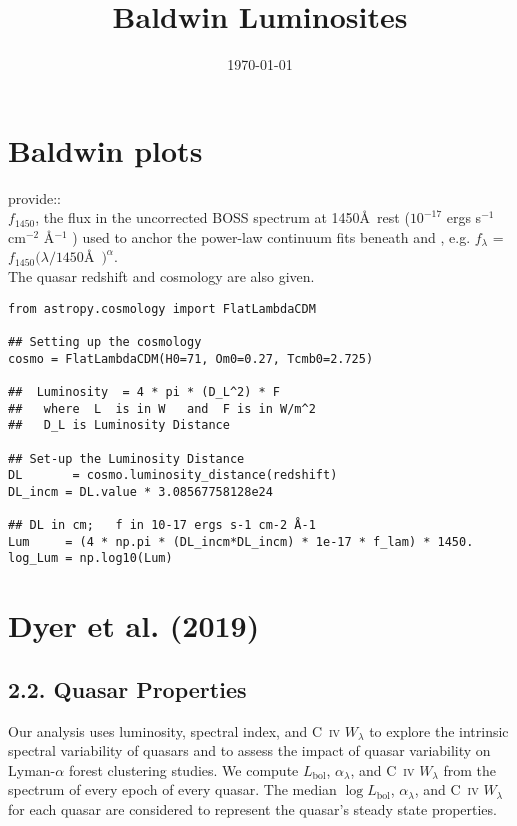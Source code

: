 \documentclass[11pt,a4paper]{article}
\begin{document}
   \title{Baldwin Luminosites}
 \date{\today}
\maketitle


\section{Baldwin plots}
\citet{Hamann2017} provide:: \\

\noindent
$f_{1450}$, the
flux in the uncorrected BOSS spectrum at 1450\AA\ rest ($10^{−17}$
ergs s$^{−1}$ cm$^{-2}$ \AA$^{-1}$ ) used to anchor the power-law
continuum fits beneath \civ and \nv, e.g. $f_{\lambda}$ = $f_{1450} (\lambda/1450$\AA\ $)^{\alpha}$. \\
The quasar redshift and cosmology are also given. 

\begin{lstlisting}
from astropy.cosmology import FlatLambdaCDM

## Setting up the cosmology
cosmo = FlatLambdaCDM(H0=71, Om0=0.27, Tcmb0=2.725)                                                    

##  Luminosity  = 4 * pi * (D_L^2) * F      
##   where  L  is in W   and  F is in W/m^2
##   D_L is Luminosity Distance 

## Set-up the Luminosity Distance 
DL       = cosmo.luminosity_distance(redshift)             
DL_incm = DL.value * 3.08567758128e24

## DL in cm;   f in 10-17 ergs s-1 cm-2 Å-1
Lum     = (4 * np.pi * (DL_incm*DL_incm) * 1e-17 * f_lam) * 1450.
log_Lum = np.log10(Lum)
\end{lstlisting}



\section{Dyer et al. (2019)}

\subsection*{2.2. Quasar Properties}
Our analysis uses luminosity, spectral index, and \textsc{C~iv}
$W_\lambda$ to explore the intrinsic spectral variability of quasars
and to assess the impact of quasar variability on Lyman-$\alpha$
forest clustering studies. We compute $L_{\mathrm{bol}}$,
$\alpha_{\lambda}$, and \textsc{C~iv} $W_\lambda$ from the spectrum of
every epoch of every quasar. The median $\log{L_{\mathrm{bol}}}$,
$\alpha_\lambda$, and \textsc{C~iv} $W_\lambda$ for each quasar are
considered to represent the quasar's steady state properties.
\end{document}
